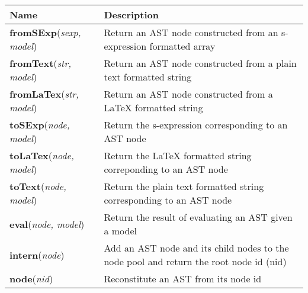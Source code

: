 \documentclass{article}
\begin{document}
\begin{tabular}{ | l | p{10cm} |}
\hline
{\bf Name} & {\bf Description} \\ \hline
{\bf fromSExp}(\emph{sexp, model}) & Return an AST node constructed from an s-expression formatted array \\ \hline
{\bf fromText}(\emph{str, model})  & Return an AST node constructed from a plain text formatted string \\ \hline
{\bf fromLaTex}(\emph{str, model}) & Return an AST node constructed from a LaTeX formatted string \\ \hline
{\bf toSExp}(\emph{node, model})  & Return the s-expression corresponding to an AST node \\ \hline
{\bf toLaTex}(\emph{node, model}) & Return the LaTeX formatted string correponding to an AST node \\ \hline
{\bf toText}(\emph{node, model})  & Return the plain text formatted string corresponding to an AST node\\ \hline
{\bf eval}(\emph{node, model}) & Return the result of evaluating an AST given a model \\ \hline
{\bf intern}(\emph{node}) & Add an AST node and its child nodes to the node pool and return the root node id (nid) \\ \hline
{\bf node}(\emph{nid}) & Reconstitute an AST from its node id \\ \hline
\end{tabular}
\end{document}
